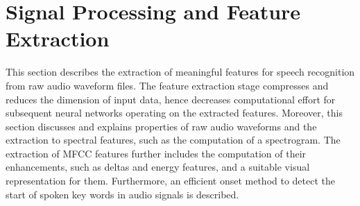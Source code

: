 
\chapter{Signal Processing and Feature Extraction}\label{sec:signal}
This section describes the extraction of meaningful features for speech recognition from raw audio waveform files.
The feature extraction stage compresses and reduces the dimension of input data, hence decreases computational effort for subsequent neural networks operating on the extracted features.
Moreover, this section discusses and explains properties of raw audio waveforms and the extraction to spectral features, such as the computation of a spectrogram. 
The extraction of MFCC features further includes the computation of their enhancements, such as deltas and energy features, and a suitable visual representation for them.
Furthermore, an efficient onset method to detect the start of spoken key words in audio signals is described.





